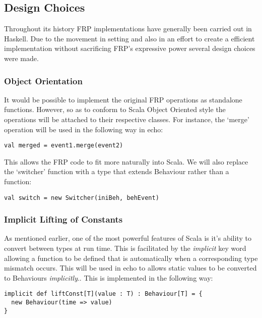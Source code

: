 \documentclass[12pt]{article}
\begin{document}
    \subsection{Design Choices}
    Throughout its history FRP implementations have generally been carried out in Haskell. Due to the movement
    in setting and also in an effort to create a efficient implementation without sacrificing FRP's expressive power
    several design choices were made. 
    
      \subsubsection{Object Orientation}
        It would be possible to implement the original FRP operations as standalone functions. However, so
        as to conform to Scala Object Oriented style the operations will be attached to their respective
        classes. For instance, the `merge' operation will be used in the following way in echo:
        
\begin{verbatim}
val merged = event1.merge(event2)
\end{verbatim}

      This allows the FRP code to fit more naturally into Scala. We will also replace the `switcher' function
      with a type that extends Behaviour rather than a function:
      
\begin{verbatim}
val switch = new Switcher(iniBeh, behEvent)
\end{verbatim}

      \subsubsection{Implicit Lifting of Constants}
        As mentioned earlier, one of the most powerful features of Scala is it's ability to convert between
        types at run time. This is facilitated by the \emph{implicit} key word allowing a function to be defined
        that is automatically when a corresponding type mismatch occurs. This will be used in echo to allows 
        static values to be converted to Behaviours \emph{implicitly}.. This is implemented in the following way:  

\begin{verbatim}
implicit def liftConst[T](value : T) : Behaviour[T] = {
  new Behaviour(time => value)
}
\end{verbatim}              
        
\end{document}
